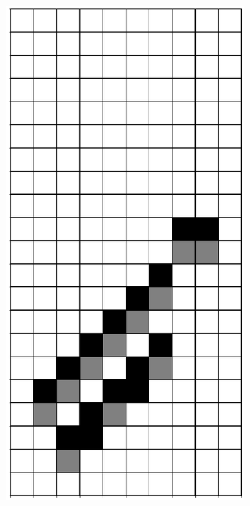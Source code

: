 \documentclass[12pt]{article}
\numberwithin{figure}{section} %
\begin{document}
\begin{figure}[H]
\begin{subfigure}{0.3\textwidth}
     \subcaption{}
   \end{subfigure}
      \newline
   \setcounter{subfigure}{0}
         \begin{subfigure}{0.3\textwidth}
     \centering
     \includegraphics[angle=270,width=\linewidth]{Section4/23.0}

\end{subfigure}
\end{figure}
\end{document}
